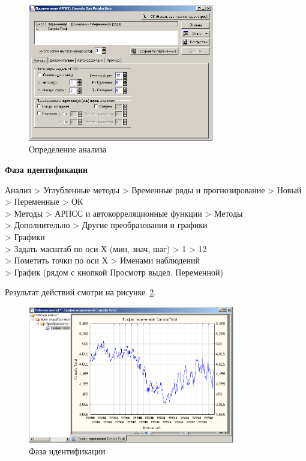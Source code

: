 \begin{figure}[!h]
  \centering

  \includegraphics[height=6cm]
  {inc/Canada_Gas_Production/2.PNG}

  \caption{Определение анализа}

  \label{fig:2_2}
\end{figure}

\begin{center}
  \textbf{Фаза идентификации}
\end{center}

Анализ > Углубленные методы > Временные ряды и прогнозирование > Новый\\
> Переменные > ОК\\
> Методы > АРПСС и автокорреляционные функции > Методы \\
> Дополнительно > Другие преобразования и графики\\
> Графики\\
> Задать масштаб по оси Х (мин, знач, шаг) > 1 > 12\\
> Пометить точки по оси Х > Именами наблюдений\\
> График (рядом с кнопкой Просмотр выдел. Переменной)

Результат действий смотри на рисунке~\ref{fig:2_3}.

\begin{figure}[!h]
  \centering

  \includegraphics[height=6cm]
  {inc/Canada_Gas_Production/3.PNG}

  \caption{Фаза идентификации}

  \label{fig:2_3}
\end{figure}

